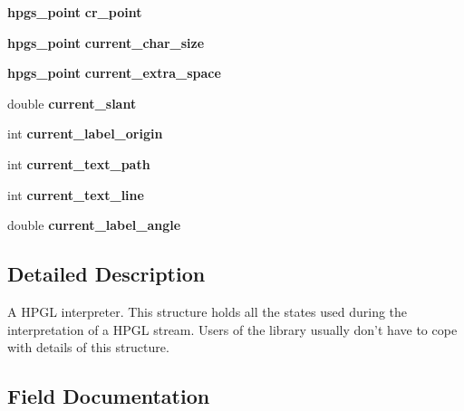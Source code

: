 \begin{Indent}{\bf }\par
{\em \label{_amgrpd41d8cd98f00b204e9800998ecf8427e}
 }\begin{DoxyCompactItemize}
\item 
{\bf hpgs\_\-point} {\bf cr\_\-point}
\item 
{\bf hpgs\_\-point} {\bfseries current\_\-char\_\-size}\label{structhpgs__reader__st_a89602a47d739d1447cec5c9512206217}

\item 
{\bf hpgs\_\-point} {\bfseries current\_\-extra\_\-space}\label{structhpgs__reader__st_af735f045829c8adcdfc25e02a20cf0a7}

\item 
double {\bfseries current\_\-slant}\label{structhpgs__reader__st_a0b86cd57160128c8ce27ee6f4792b97f}

\item 
int {\bfseries current\_\-label\_\-origin}\label{structhpgs__reader__st_a8bf22f602c40554105e0a6d7f442fe12}

\item 
int {\bfseries current\_\-text\_\-path}\label{structhpgs__reader__st_a9e6eedcf159c66ae00b33a5cb219f981}

\item 
int {\bfseries current\_\-text\_\-line}\label{structhpgs__reader__st_afa2b325c62bdc91cb9e7e620f03fb2e1}

\item 
double {\bfseries current\_\-label\_\-angle}\label{structhpgs__reader__st_ac648cfbddbe85a41e8c5bf8a5d600cd3}

\end{DoxyCompactItemize}
\end{Indent}


\subsection{Detailed Description}
A HPGL interpreter. This structure holds all the states used during the interpretation of a HPGL stream. Users of the library usually don't have to cope with details of this structure. 

\subsection{Field Documentation}
